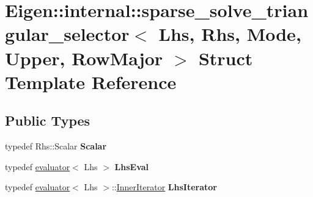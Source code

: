 \hypertarget{struct_eigen_1_1internal_1_1sparse__solve__triangular__selector_3_01_lhs_00_01_rhs_00_01_mode_00_01_upper_00_01_row_major_01_4}{}\section{Eigen\+::internal\+::sparse\+\_\+solve\+\_\+triangular\+\_\+selector$<$ Lhs, Rhs, Mode, Upper, Row\+Major $>$ Struct Template Reference}
\label{struct_eigen_1_1internal_1_1sparse__solve__triangular__selector_3_01_lhs_00_01_rhs_00_01_mode_00_01_upper_00_01_row_major_01_4}
\subsection*{Public Types}
\begin{DoxyCompactItemize}
\item 
\mbox{\label{struct_eigen_1_1internal_1_1sparse__solve__triangular__selector_3_01_lhs_00_01_rhs_00_01_mode_00_01_upper_00_01_row_major_01_4_a6d464a2d63d8fd28959cc66e89d195c2}} 
typedef Rhs\+::\+Scalar {\bfseries Scalar}
\item 
\mbox{\label{struct_eigen_1_1internal_1_1sparse__solve__triangular__selector_3_01_lhs_00_01_rhs_00_01_mode_00_01_upper_00_01_row_major_01_4_ac945019ee802bf16e4f13d3909ba4d4a}} 
typedef \mbox{\hyperlink{struct_eigen_1_1internal_1_1evaluator}{evaluator}}$<$ Lhs $>$ {\bfseries Lhs\+Eval}
\item 
\mbox{\label{struct_eigen_1_1internal_1_1sparse__solve__triangular__selector_3_01_lhs_00_01_rhs_00_01_mode_00_01_upper_00_01_row_major_01_4_a6779065e7ad84d16b23ae8ef0077a263}} 
typedef \mbox{\hyperlink{struct_eigen_1_1internal_1_1evaluator}{evaluator}}$<$ Lhs $>$\+::\mbox{\hyperlink{class_eigen_1_1_inner_iterator}{Inner\+Iterator}} {\bfseries Lhs\+Iterator}
\end{DoxyCompactItemize}
